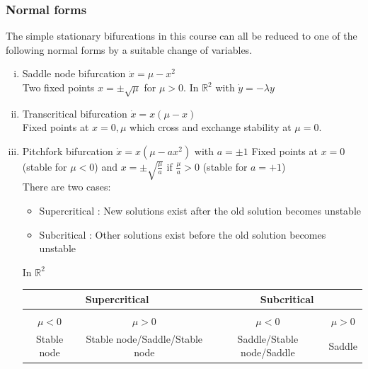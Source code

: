 \documentclass{article}
\newcommand{\rtwo}{\mathbb{R}^2}                            %
\begin{document}
\subsubsection*{Normal forms}
The simple stationary bifurcations in this course can all be reduced to one of
the following normal forms by a suitable change of variables.
\begin{enumerate}[(i)] %
\item Saddle node bifurcation $\dot{x} = \mu -x^2$
      \\
      Two fixed points $x = \pm \sqrt{\mu}$ for $\mu >0$.
      In $\mathbb{R}^2$ with $\dot{y} = -\lambda y$
\item Transcritical bifurcation $\dot{x} = x(\mu -x)$
      \\
      Fixed points at $x=0, \mu$ which cross and exchange stability at 
      $\mu =0$.
\item Pitchfork bifurcation $\dot{x} = x(\mu -ax^2) $ with $a = \pm 1$
      Fixed points at $x=0$ (stable for $\mu<0$) and $\displaystyle x = 
      \pm \sqrt{\frac{\mu}{a}}$ if $\displaystyle \frac{\mu}{a} >0$ 
      (stable for $a=+1$)
      \\
      There are two cases:
      \begin{itemize}
      \item Supercritical : New solutions exist after the old solution becomes
            unstable
      \item Subcritical : Other solutions exist before the old solution becomes
            unstable
      \end{itemize}
      In $\rtwo$ \\
      \begin{center}
      \begin{tabular}{cc|cc}
      \multicolumn{2}{c|}{Supercritical} & \multicolumn{2}{c}{Subcritical} 
      \\\hline \vspace{-3mm} & & &  \\
      $\mu <0$ & $\mu >0$ & $\mu < 0$ & $\mu >0$ \\
      Stable node & Stable node/Saddle/Stable node & Saddle/Stable node/Saddle & Saddle 
      \end{tabular}
      \end{center}
\end{enumerate}
\end{document}
